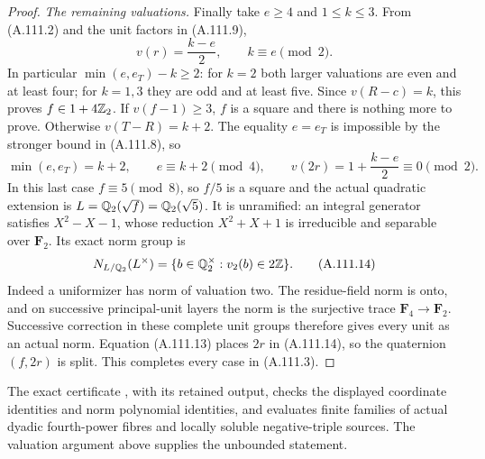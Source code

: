 \begin{proof}
\emph{The remaining valuations.}
Finally take $e\ge4$ and $1\le k\le3$.
From (A.111.2) and the unit factors in (A.111.9),
\[
           v(r)=\frac{k-e}{2},\qquad k\equiv e\pmod2.
\tag{A.111.12}
\]
In particular
$\min(e,e_T)-k\ge2$: for $k=2$ both larger
valuations are even and at least four; for $k=1,3$
they are odd and at least five.
Since $v(R-c)=k$, this proves $f\in1+4\mathbb Z_2$.
If $v(f-1)\ge3$, $f$ is a square and there is
nothing more to prove.
Otherwise $v(T-R)=k+2$.
The equality $e=e_T$ is impossible by the stronger
bound in (A.111.8), so
\[
 \min(e,e_T)=k+2,
 \qquad e\equiv k+2\pmod4,
 \qquad v(2r)=1+\frac{k-e}{2}\equiv0\pmod2.
\tag{A.111.13}
\]
In this last case $f\equiv5\pmod8$, so $f/5$ is
a square and the actual quadratic extension is
$L=\mathbb Q_2(\sqrt f)=\mathbb Q_2(\sqrt5)$.
It is unramified: an integral generator satisfies
$X^2-X-1$, whose reduction $X^2+X+1$ is
irreducible and separable over $\mathbf F_2$.
Its exact norm group is
\[
       N_{L/\mathbb Q_2}(L^\times)
              =\{b\in\mathbb Q_2^\times:v_2(b)\in2\mathbb Z\}.
\tag{A.111.14}
\]
Indeed a uniformizer has norm of valuation two.
The residue-field norm is onto, and on successive
principal-unit layers the norm is the surjective
trace $\mathbf F_4\to\mathbf F_2$.
Successive correction in these complete unit groups
therefore gives every unit as an actual norm.
Equation (A.111.13) places $2r$ in (A.111.14),
so the quaternion $(f,2r)$ is split.
This completes every case in (A.111.3).
\end{proof}

The exact certificate
,
with its retained output, checks the displayed
coordinate identities and norm polynomial identities,
and evaluates finite families of actual dyadic
fourth-power fibres and locally soluble negative-triple
sources.  The valuation argument above supplies the
unbounded statement.
